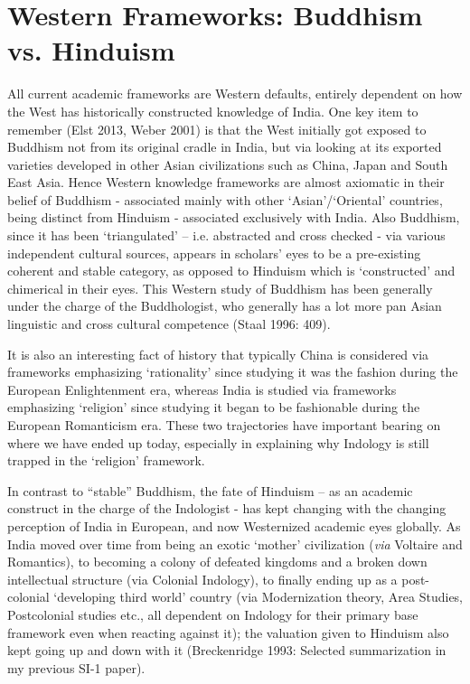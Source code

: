 \section*{Western Frameworks: Buddhism vs. Hinduism}

All current academic frameworks are Western defaults, entirely dependent on how the West has historically constructed knowledge of India. One key item to remember (Elst 2013, Weber 2001) is that the West initially got exposed to Buddhism not from its original cradle in India, but via looking at its exported varieties developed in other Asian civilizations such as China, Japan and South East Asia. Hence Western knowledge frameworks are almost axiomatic in their belief of Buddhism - associated mainly with other ‘Asian’/‘Oriental’ countries, being distinct from Hinduism - associated exclusively with India. Also Buddhism, since it has been ‘triangulated’ – i.e. abstracted and cross checked - via various independent cultural sources, appears in scholars’ eyes to be a pre-existing coherent and stable category, as opposed to Hinduism which is ‘constructed’ and chimerical in their eyes. This Western study of Buddhism has been generally under the charge of the Buddhologist, who generally has a lot more pan Asian linguistic and cross cultural competence (Staal 1996: 409).

It is also an interesting fact of history that typically China is considered via frameworks emphasizing ‘rationality’ since studying it was the fashion during the European Enlightenment era, whereas India is studied via frameworks emphasizing ‘religion’ since studying it began to be fashionable during the European Romanticism era. These two trajectories have important bearing on where we have ended up today, especially in explaining why Indology is still trapped in the ‘religion’ framework.

In contrast to “stable” Buddhism, the fate of Hinduism – as an academic construct in the charge of the Indologist - has kept changing with the changing perception of India in European, and now Westernized academic eyes globally. As India moved over time from being an exotic ‘mother’ civilization (\textit{via} Voltaire and Romantics), to becoming a colony of defeated kingdoms and a broken down intellectual structure (via Colonial Indology), to finally ending up as a post-colonial ‘developing third world’ country (via Modernization theory, Area Studies, Postcolonial studies etc., all dependent on Indology for their primary base framework even when reacting against it); the valuation given to Hinduism also kept going up and down with it (Breckenridge 1993: Selected summarization in my previous SI-1 paper).

